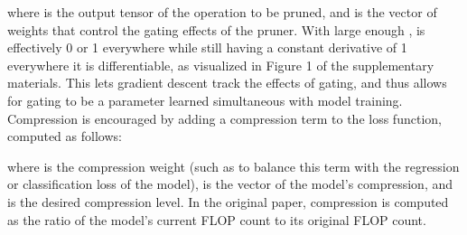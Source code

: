 \documentclass[10pt,twocolumn,letterpaper]{article}
\begin{document}
where  is the output tensor of the operation to be pruned, and  is the vector of weights that control the gating effects of the pruner. With large enough ,  is effectively 0 or 1 everywhere while still having a constant derivative of 1 everywhere it is differentiable, as visualized in Figure 1 of the supplementary materials. This lets gradient descent track the effects of gating, and thus allows for gating to be a parameter learned simultaneous with model training. Compression is encouraged by adding a compression term to the loss function, computed as follows:

where  is the compression weight (such as to balance this term with the regression or classification loss of the model),  is the vector of the model's compression, and  is the desired compression level. In the original paper, compression is computed as the ratio of the model's current FLOP count to its original FLOP count.
\end{document}
